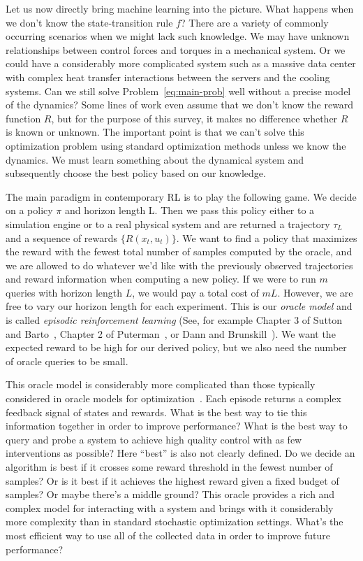 \documentclass[11pt]{article}
\newcommand{\eqd}[1]{\eqref{eq:#1}}
\numberwithin{equation}{section}
\begin{document}
Let us now directly bring machine learning into the picture.  What happens when we don't know the state-transition rule $f$? There are a variety of commonly occurring scenarios when we might lack such knowledge. We may have unknown relationships between control forces and torques in a mechanical system. Or we could have a considerably more complicated system such as a massive data center with complex heat transfer interactions between the servers and the cooling systems. Can we still solve Problem~\eqd{main-prob} well without a precise model of the dynamics? Some lines of work even assume that we don't know the reward function $R$, but for the purpose of this survey, it makes no difference whether $R$ is known or unknown. The important point is that we can't solve this optimization problem using standard optimization methods unless we know the dynamics. We must learn something about the dynamical system and subsequently choose the best policy based on our knowledge.

The main paradigm in contemporary RL is to play the following game. We decide on a policy $\pi$ and horizon length L. Then we pass this policy either to a simulation engine or to a real physical system and are returned a trajectory $\tau_L$ and a sequence of rewards $\{R(x_t,u_t)\}$. We want to find a policy that maximizes the reward with the fewest total number of samples computed by the oracle, and we are allowed to do  whatever we'd like with the previously observed trajectories and reward information when computing a new policy. 
If we were to run $m$ queries with horizon length $L$, we would pay a total cost of $mL$.  However, we are free to vary our horizon length for each experiment. This is our \emph{oracle model} and is called \emph{episodic reinforcement learning} (See, for example Chapter 3 of Sutton and Barto~\cite{SuttonBartoBook}, Chapter 2 of Puterman~\cite{PutermanBook}, or Dann and Brunskill~\cite{Dann15}).  We want the expected reward to be high for our derived policy, but we also need the number of oracle queries to be small.

This oracle model is considerably more complicated than those typically considered in oracle models for optimization~\cite{NemirovskiYudinBook}. Each episode returns a complex feedback signal of states and rewards. What is the best way to tie this information together in order to improve performance? What is the best way to query and probe a system to achieve high quality control with as few interventions as possible? Here ``best'' is also not clearly defined. Do we decide an algorithm is best if it crosses some reward threshold in the fewest number of samples?  Or is it best if it achieves the highest reward given a fixed budget of samples? Or maybe there's a middle ground? This oracle provides a rich and complex model for interacting with a system and brings with it considerably more complexity than in standard stochastic optimization settings. What's the most efficient way to use all of the collected data in order to improve future performance?
\end{document}

